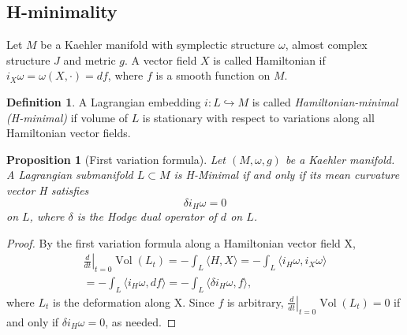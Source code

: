 \documentclass[jsg]{IP_v1_forauthors}
\def\Vol{\mathop{\mathrm{Vol}}}
\newtheorem{prop}[theo]{Proposition}
\theoremstyle{definition}
\newtheorem{defi}[theo]{Definition}
\numberwithin{equation}{section}
\begin{document}
\subsection{H-minimality}


Let $M$ be a Kaehler manifold with symplectic structure $\omega$, almost complex structure $J$ and metric $g$. A vector field $X$ is called Hamiltonian if $i_X \omega = \omega (X,\cdot)=df$, where $f$ is a smooth function on $M$.
\begin{defi}
A Lagrangian embedding $i:L \hookrightarrow M$ is called {\itshape Hamiltonian-minimal (H-minimal)} if volume of $L$ is stationary with respect to variations along all Hamiltonian vector fields.
\end{defi}
\begin{prop}[First variation formula]
Let $(M,\omega,g)$ be a Kaehler manifold. A Lagrangian submanifold $L \subset M$ is H-Minimal if and only if its mean curvature vector H satisfies
\begin{equation}
\delta i_H \omega = 0 
\end{equation}
on $L$, where $\delta$ is the Hodge dual operator of $d$ on $L$.
\end{prop}
\begin{proof}
By the first variation formula along a Hamiltonian vector field X,
\begin{multline} \left. \frac d {dt} \right |_{t=0}  \Vol(L_t) = - \int_L \langle H , X \rangle = - \int_L \langle i_H \omega , i_X \omega \rangle \\ = - \int_L \langle i_H \omega , d f \rangle  = - \int_L \langle \delta i_H \omega, f \rangle ,
\end{multline}
where $L_t$ is the deformation along X. Since $f$ is arbitrary, $\left. \frac d {dt} \right |_{t=0}   \Vol(L_t) = 0$ if and only if $ \delta i_H \omega = 0 $, as needed.
\end{proof}
\end{document}
